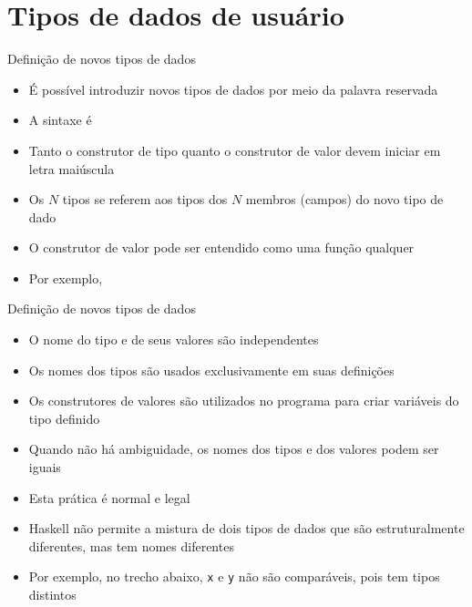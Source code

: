 \section{Tipos de dados de usuário}

\begin{frame}[fragile]{Definição de novos tipos de dados}

    \begin{itemize}
        \item É possível introduzir novos tipos de dados por meio da palavra reservada

        \item A sintaxe é


        \item Tanto o construtor de tipo quanto o construtor de valor devem iniciar em
            letra maiúscula

        \item Os $N$ tipos se referem aos tipos dos $N$ membros (campos) do novo tipo de dado

        \item O construtor de valor pode ser entendido como uma função qualquer

        \item Por exemplo, 

    \end{itemize}

\end{frame}

\begin{frame}[fragile]{Definição de novos tipos de dados}

    \begin{itemize}
        \item O nome do  tipo e de seus valores são independentes

        \item Os nomes dos tipos são usados exclusivamente em suas definições

        \item Os construtores de valores são utilizados no programa para criar variáveis do
            tipo definido

        \item Quando não há ambiguidade, os nomes dos tipos e dos valores podem ser iguais

        \item Esta prática é normal e legal

        \item Haskell não permite a mistura de dois tipos de dados que são estruturalmente
            diferentes, mas tem nomes diferentes

        \item Por exemplo, no trecho abaixo,
        \texttt{x} e \texttt{y} não são comparáveis, pois tem tipos distintos
    \end{itemize}

\end{frame}

